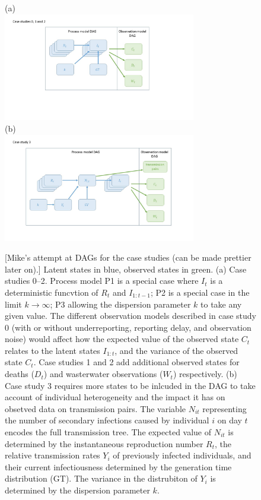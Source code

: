 \documentclass{article}
\begin{document}
\begin{figure}
\centering
(a) \\
\includegraphics[width=0.75\textwidth]{figures/case_study_0_1_2.jpg}\\
(b)\\
\includegraphics[width=0.75\textwidth]{figures/case_study_3.jpg}
\label{fig:CS3_DAG}
\caption{[Mike's attempt at DAGs for the case studies (can be made prettier later on).] Latent states in blue, observed states in green. (a) Case studies 0--2. Process model P1 is a special case where $I_t$ is a deterministic funcvtion of $R_t$ and $I_{1:t-1}$; P2 is a special case in the limit $k\to\infty$; P3 allowing the dispersion parameter $k$ to take any given value. The different observation models described in case study 0 (with or without underreporting, reporting delay, and observation noise) would affect how the expected value of the observed state $C_t$ relates to the latent states $I_{1:t}$, and the variance of the observed state $C_t$. Case studies 1 and 2 add additional observed states for deaths ($D_t$) and wasterwater observations ($W_t$) respectively. (b) Case study 3 requires more states to be inlcuded in the DAG to take account of individual heterogeneity and the impact it has on obsetved data on transmission pairs. The variable $N_{it}$ representing the number of secondary infections caused by individual $i$ on day $t$ encodes the full transmission tree. The expected value of $N_{it}$ is determined by the instantaneous reproduction number $R_t$, the relative transmission rates $Y_i$ of previously infected individuals, and their current infectiousness determined by the generation time distribution (GT). The variance in the distrubiton of $Y_i$ is determined by the dispersion parameter $k$.  }
\end{figure}
\end{document}
